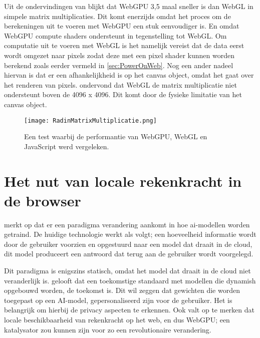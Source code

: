 Uit de ondervindingen van \textcite{Radin2021} blijkt dat WebGPU 3,5 maal sneller is dan WebGL in simpele matrix multiplicaties. Dit komt enerzijds omdat het proces om de berekeningen uit te voeren met WebGPU een stuk eenvoudiger is. En omdat WebGPU compute shaders ondersteunt in tegenstelling tot WebGL. Om computatie uit te voeren met WebGL is het namelijk vereist dat de data eerst wordt omgezet naar pixels zodat deze met een pixel shader kunnen worden berekend zoals eerder vermeld in \ref{sec:PowerOnWeb}. Nog een ander nadeel hiervan is dat er een afhankelijkheid is op het canvas object, omdat het gaat over het renderen van pixels. \textcite{Radin2021} ondervond dat WebGL de matrix multiplicatie niet ondersteunt boven de 4096 x 4096. Dit komt door de fysieke limitatie van het canvas object.

\begin{figure}
    \texttt{[image: RadinMatrixMultiplicatie.png]}
    \caption[Matrixvermenigvuldiging test \autocite{Radin2021}]{Een test waarbij de performantie van WebGPU, WebGL en JavaScript werd vergeleken.  \autocite{Radin2021}}
    \label{fig:Matrix Multiplication By Radin}
\end{figure}

\break{}

\section{Het nut van locale rekenkracht in de browser} %

\textcite{Fleetwood2022} merkt op dat er een paradigma verandering aankomt in hoe ai-modellen worden getraind. De huidige technologie werkt als volgt; een hoeveelheid informatie wordt door de gebruiker voorzien en opgestuurd naar een model dat draait in de cloud, dit model produceert een antwoord dat terug aan de gebruiker wordt voorgelegd.

\bigbreak{}

Dit paradigma is enigszins statisch, omdat het model dat draait in de cloud niet veranderlijk is. \textcite{Fleetwood2022} gelooft dat een toekomstige standaard met modellen die dynamish opgebouwd worden, de toekomst is. Dit wil zeggen dat gewichten die worden toegepast op een AI-model, gepersonaliseerd zijn voor de gebruiker. Het is belangrijk om hierbij de privacy aspecten te erkennen. Ook valt op te merken dat locale beschikbaarheid van rekenkracht op het web, en dus WebGPU; een katalysator zou kunnen zijn voor zo een revolutionaire verandering.

